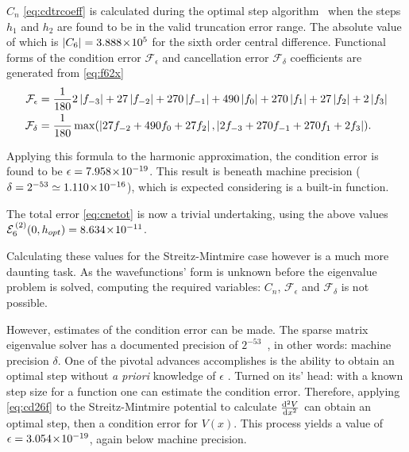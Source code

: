 $C_n$ \cref{eq:cdtrcoeff} is calculated during the optimal step algorithm~\cite{Mathur2012} when the steps $h_1$ and $h_2$ are found to be in the valid truncation error range.
The absolute value of which is $\left\lvert C_6\right\rvert = 3.888\!\times\!10^{5}$ for the sixth order central difference.
Functional forms of the condition error $\mathcal{F}_\epsilon$ and cancellation error $\mathcal{F}_\delta$ coefficients are generated from \cref{eq:f62x}
{\mathindent=0.4cm
\begin{align}
\mathcal{F}_\epsilon &= \frac{1}{180}2\left\lvert f_{-3}\right\rvert + 27\left\lvert f_{-2}\right\rvert + 270\left\lvert f_{-1}\right\rvert + 490\left\lvert f_{0}\right\rvert + 270\left\lvert f_{1}\right\rvert + 27\left\lvert f_{2}\right\rvert + 2\left\lvert f_{3}\right\rvert \\
\mathcal{F}_\delta &= \frac{1}{180}\max(\left\lvert 27f_{-2} + 490f_{0} + 27f_{2}\right\rvert,\left\lvert 2f_{-3} + 270f_{-1} + 270f_{1} + 2f_{3}\right\rvert).
\end{align}
}

Applying this formula to the harmonic approximation, the condition error is found to be $\epsilon = 7.958\!\times\!10^{-19}$.
This result is beneath machine precision ($\delta = 2^{-53} \simeq 1.110\!\times\!10^{-16}$), which is expected considering  is a built-in function.

The total error \cref{eq:cnetot} is now a trivial undertaking, using the above values $\mathcal{E}_6^{\,(2)}(0,h_{opt}) = 8.634\!\times\!10^{-11}$.

Calculating these values for the Streitz-Mintmire case however is a much more daunting task.
As the wavefunctions' form is unknown before the eigenvalue problem is solved, computing the required variables: $C_n$, $\mathcal{F}_\epsilon$ and $\mathcal{F}_\delta$ is not possible.

However, estimates of the condition error can be made.
The sparse matrix eigenvalue solver  has a documented precision of $2^{-53}$~\cite{Mathworks2014}, in other words: machine precision $\delta$.
One of the pivotal advances \citeauthor{Mathur2012} accomplishes is the ability to obtain an optimal step without \emph{a priori} knowledge of $\epsilon$ \cite{Mathur2012}.
Turned on its' head: with a known step size for a function one can estimate the condition error.
Therefore, applying \cref{eq:cd26f} to the Streitz-Mintmire potential to calculate $\cramped{\frac{\mathrm{d}^2V}{\mathrm{d}x^2}}$ can obtain an optimal step, then a condition error for $V(x)$.
This process yields a value of $\epsilon = 3.054\!\times\!10^{-19}$, again below machine precision.

